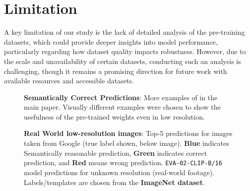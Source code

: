 \section{Limitation}
\iffalse
\begin{enumerate}
    \item Doesn't work for CLIP A deeper investigation
    \item Like SR, resolution-dependent 
    \item Investigate where to insert tokens future todo patchification may be hiring 
    \item very naive solution proposed.... modified todo in future 
    \item Investigate what differentiates datasets-based performance. 
\end{enumerate}
\fi


A key limitation of our study is the lack of detailed analysis of the pre-training datasets, which could provide deeper insights into model performance, particularly regarding how dataset quality impacts robustness. However, due to the scale and unavailability of certain datasets, conducting such an analysis is challenging, though it remains a promising direction for future work with available resources and accessible datasets.













\begin{figure}[!t]
\centering
{}
\caption{ 
\textbf{Semantically Correct Predictions}: More examples of  in the main paper. Visually different examples were chosen to show the usefulness of the pre-trained weights even in low resolution. 
}
\label{fig:semantically_resonable_prediction}
\end{figure}


\begin{figure}[!t]
\centering
{}
\caption{ 
\textbf{Real World low-resolution images}: Top-5 predictions for images taken from Google (true label shown, below image). \textbf{Blue} indicates Semantically reasonable prediction, \textbf{Green} indicates correct prediction, and \textbf{Red} means wrong prediction. \texttt{EVA-02-CLIP-B/16} model predictions for unknown resolution (real-world footage). Labels/templates are chosen from the \textbf{ImageNet dataset}.
}
\label{fig:semantically_resonable_prediction2}
\end{figure}
